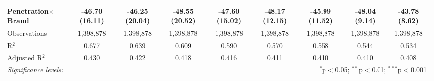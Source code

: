 \begin{table}[!htbp]
\begin{sideways}
{\begin{tabular}{@{\extracolsep{5pt}}lcccccccc}
  Penetration$\times$Brand & -46.70$ $(16.11) & -46.25$ $(20.04) & -48.55$ $(20.52) & -47.60$ $(15.02) & -48.17$ $(12.15) & -45.99$ $(11.52) & -48.04$ $(9.14) & -43.78$ $(8.62) \\ 
 \hline
Observations & 1,398,878 & 1,398,878 &  1,398,878 &  1,398,878 &  1,398,878 &  1,398,878 &  1,398,878 &  1,398,878\\ 
R$^{2}$ & 0.677 & 0.639 & 0.609 & 0.590 & 0.570 & 0.558 & 0.544 & 0.534 \\ 
Adjusted R$^{2}$ & 0.430 & 0.422 & 0.418 & 0.416 & 0.411 & 0.410 & 0.410 & 0.408 \\ 
\hline 

\textit{Significance levels:}  & \multicolumn{8}{r}{$^{*}$p$<$0.05; $^{**}$p$<$0.01; $^{***}$p$<$0.001} \\
\end{tabular} 
} \end{sideways}
\end{table} 
